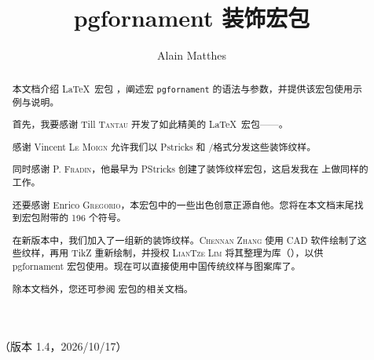 \documentclass[a4paper,nofonts]{tufte-handout}
\title{pgfornament 装饰宏包}
\author{Alain Matthes}
\begin{document}
\maketitle
\noindent{}
\begin{marginfigure}
\end{marginfigure}


\bigskip
\noindent{}\ （版本 1.4，2026/10/17）
\begin{abstract}

本文档介绍 \LaTeX\ 宏包 \emph{}，阐述宏 \texttt{pgfornament} 的语法与参数，并提供该宏包使用示例与说明。

首先，我要感谢 {Till \textsc{Tantau}} 开发了如此精美的 \LaTeX\ 宏包——\TIKZ。

感谢 Vincent \textsc{Le Moign} 允许我们以 Pstricks 和 \PGF/\TIKZ 格式分发这些装饰纹样。

同时感谢 \textsc{P. Fradin}，他最早为 PStricks 创建了装饰纹样宏包，这启发我在 \TIKZ 上做同样的工作。

还要感谢 {Enrico \textsc{Gregorio}}，本宏包中的一些出色创意正源自他。您将在本文档末尾找到宏包附带的 196 个符号。

在新版本中，我们加入了一组新的装饰纹样。\textsc{Chennan Zhang} 使用 CAD 软件绘制了这些纹样，再用 TikZ 重新绘制，并授权 \textsc{LianTze Lim} 将其整理为库（\emph{}），以供 pgfornament 宏包使用。现在可以直接使用中国传统纹样与图案库了。

除本文档外，您还可参阅 \emph{} 宏包的相关文档。
\end{abstract}

\vspace{1cm}
\hfil  {}\hfil

\tableofcontents

\vspace{1cm}
\hfil  {}\hfil

\listoffigures

\vspace{1cm}
\hfil  {}\hfil
\end{document}

